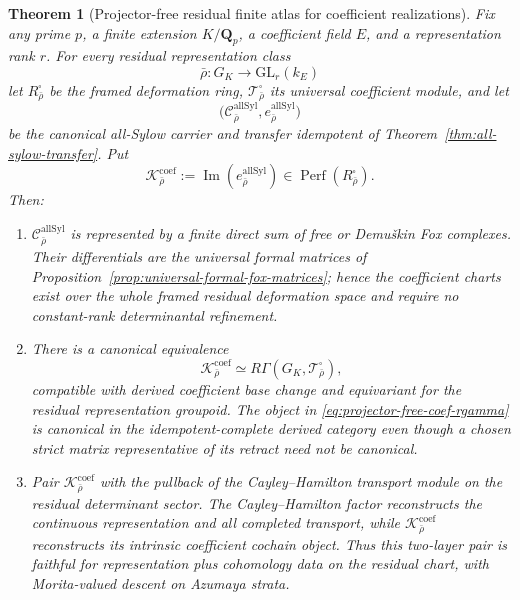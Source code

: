 \documentclass[11pt]{article}
\newtheorem{theorem}{Theorem}[section]
\theoremstyle{definition}
\begin{document}
\begin{theorem}[Projector-free residual finite atlas for coefficient realizations]\label{thm:projector-free-realization-atlas}
Fix any prime $p$, a finite extension $K/\mathbf Q_p$, a coefficient field $E$, and a representation rank $r$.
For every residual representation class
\[
 \bar\rho:G_K\longrightarrow \mathrm{GL}_r(k_E)
\]
let $R_{\bar\rho}^{\square}$ be the framed deformation ring,
$\mathcal T_{\bar\rho}^{\square}$ its universal coefficient module, and let
\[
 \bigl(\mathcal C_{\bar\rho}^{\mathrm{allSyl}},
 e_{\bar\rho}^{\mathrm{allSyl}}\bigr)
\]
be the canonical all-Sylow carrier and transfer idempotent of
Theorem~\ref{thm:all-sylow-transfer}.  Put
\[
 \mathcal K_{\bar\rho}^{\mathrm{coef}}
 :=\operatorname{Im}(e_{\bar\rho}^{\mathrm{allSyl}})
 \in\operatorname{Perf}(R_{\bar\rho}^{\square}).
\]
Then:
\begin{enumerate}[label=\textnormal{(\roman*)}]
\item $\mathcal C_{\bar\rho}^{\mathrm{allSyl}}$ is represented by a finite
direct sum of free or Demu\v{s}kin Fox complexes.  Their differentials are the
universal formal matrices of
Proposition~\ref{prop:universal-formal-fox-matrices}; hence the coefficient
charts exist over the whole framed residual deformation space and require no
constant-rank determinantal refinement.

\item There is a canonical equivalence
\begin{equation}\label{eq:projector-free-coef-rgamma}
 \mathcal K_{\bar\rho}^{\mathrm{coef}}
 \simeq
 R\Gamma(G_K,\mathcal T_{\bar\rho}^{\square}),
\end{equation}
compatible with derived coefficient base change and equivariant for the
residual representation groupoid.  The object in
\eqref{eq:projector-free-coef-rgamma} is canonical in the idempotent-complete
derived category even though a chosen strict matrix representative of its
retract need not be canonical.

\item Pair $\mathcal K_{\bar\rho}^{\mathrm{coef}}$ with the pullback of the
Cayley--Hamilton transport module on the residual determinant sector.  The
Cayley--Hamilton factor reconstructs the continuous representation and all
completed transport, while
$\mathcal K_{\bar\rho}^{\mathrm{coef}}$ reconstructs its intrinsic coefficient
cochain object.  Thus this two-layer pair is faithful for representation plus
cohomology data on the residual chart, with Morita-valued descent on Azumaya
strata.


\end{enumerate}
\end{theorem}
\end{document}
